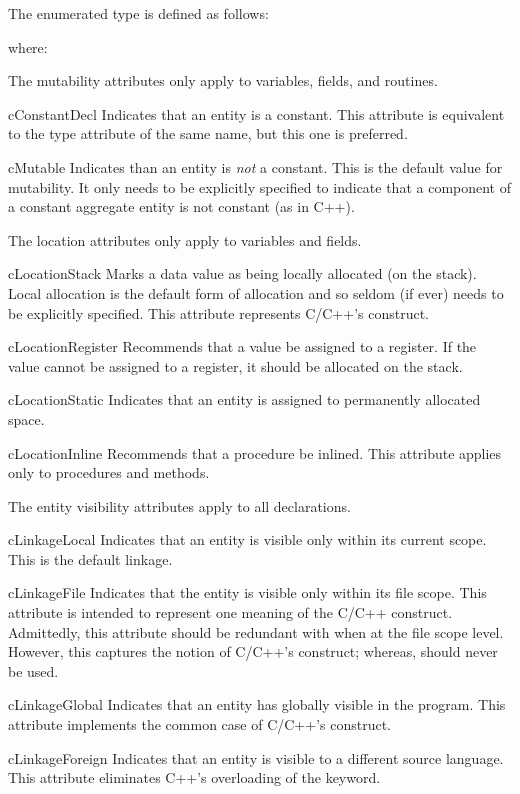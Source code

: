 The  enumerated type is defined as follows:


where:
\begin{Description}
\item [] 
The mutability attributes only apply to variables, fields, and routines.
\item [cConstantDecl] Indicates that an entity is a constant.  This
attribute is equivalent to the type attribute of the same name, but
this one is preferred.
\item [cMutable] Indicates than an entity is \emph{not} a constant.
This is the default value for mutability.  It only needs to be
explicitly specified to indicate that a component of a constant
aggregate entity is not constant (as in C++).

\item [] 
The location attributes only apply to variables and fields.
\item [cLocationStack] Marks a data value as being locally 
allocated (\ie on the stack).  Local allocation is the default form of
allocation and so seldom (if ever) needs to be explicitly specified.
This attribute represents C/C++'s  construct.
\item [cLocationRegister] Recommends that a value be assigned to a register.
If the value cannot be assigned to a register, it should be allocated
on the stack.
\item [cLocationStatic] Indicates that an entity is assigned to permanently
allocated space.
\item [cLocationInline] Recommends that a procedure be inlined.  This
attribute applies only to procedures and methods.

\item [] 
The entity visibility attributes apply to all declarations.  
\item [cLinkageLocal] Indicates that an entity is visible only within
its current scope.  This is the default linkage.
\item [cLinkageFile] Indicates that the entity is visible only within
its file scope.  This attribute is intended to represent one meaning
of the C/C++  construct.  Admittedly, this attribute
should be redundant with  when at the file scope
level.  However, this captures the notion of C/C++'s 
construct; whereas,  should never be used.
\item [cLinkageGlobal] Indicates that an entity has globally visible
in the program.  This attribute implements the common case of C/C++'s
 construct.
\item [cLinkageForeign] Indicates that an entity is visible to a
different source language.  This attribute eliminates C++'s
overloading of the  keyword.


\end{Description}
